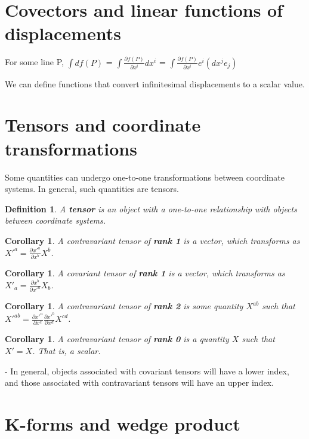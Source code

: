 \documentclass{book}
\newtheorem{defn}[equation]{Definition}
\newtheorem{coro}[equation]{Corollary}
\begin{document}
\section{Covectors and linear functions of displacements}

For some line P, $\int df(P)$ = $\int \frac{\partial f(P)}{{\partial x^i}} dx^i$ = $\int \frac{{\partial f(P)}}{{\partial x^i}} e^i (dx^j e_j)$

We can define functions that convert infinitesimal displacements to a scalar value. 




\section{Tensors and coordinate transformations}
Some quantities can undergo one-to-one transformations between coordinate systems. In general, such quantities are tensors. 


\begin{defn}
	A \textbf{tensor} is an object with a one-to-one relationship with objects between coordinate systems. 
\end{defn}

\begin{coro}
	A contravariant tensor of \textbf{rank 1} is a vector, which transforms as  $X'^a = \frac{\partial x'^a}{\partial x^b} X^b$.  
\end{coro}

\begin{coro}
	A covariant tensor of \textbf{rank 1} is a vector, which transforms as $X'_a = \frac{\partial x^b}{\partial x'^a} X_b$. 
\end{coro}

\begin{coro}
	A contravariant tensor of \textbf{rank 2} is some quantity $X^{ab}$ such that $X'^{ab} = \frac{\partial x'^a}{\partial x^c} \frac{\partial x'^b}{\partial x^d} X^{cd}$. 
\end{coro}

\begin{coro}
	A contravariant tensor of \textbf{rank 0} is a quantity $X$ such that $X' = X$. That is, a scalar. 
\end{coro}

- In general, objects associated with covariant tensors will have a lower index, and those associated with contravariant tensors will have an upper index. 

\section{K-forms and wedge product}
\end{document}
